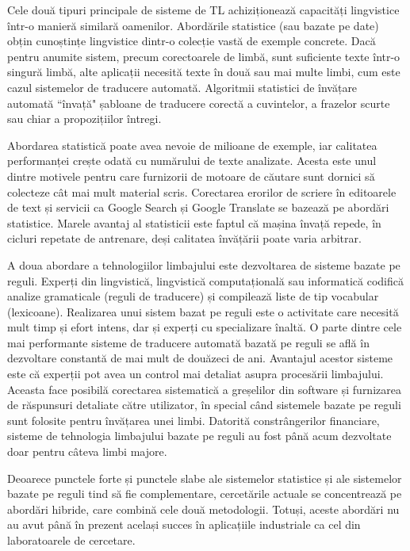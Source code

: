 \begin{multicols}{2}
Cele două tipuri principale de sisteme de TL achiziționează capacități lingvistice într-o manieră similară oamenilor. Abordările statistice (sau bazate pe date) obțin cunoștințe lingvistice dintr-o colecție vastă de exemple concrete. Dacă pentru anumite sistem, precum corectoarele de limbă, sunt suficiente texte într-o singură limbă, alte aplicații necesită texte în două sau mai multe limbi, cum este cazul sistemelor de traducere automată. Algoritmii statistici de învățare automată ``învață" șabloane de traducere corectă a cuvintelor, a frazelor scurte sau chiar a propozițiilor întregi.

Abordarea statistică poate avea nevoie de milioane de exemple, iar calitatea performanței crește odată cu numărului de texte analizate. Acesta este unul dintre motivele pentru care furnizorii de motoare de căutare sunt dornici să colecteze cât mai mult material scris. Corectarea erorilor de scriere în editoarele de text și servicii ca Google Search și Google Translate se bazează pe abordări statistice. Marele avantaj al statisticii este faptul că mașina învață repede, în cicluri repetate de antrenare, deși calitatea învățării poate varia arbitrar.

A doua abordare a tehnologiilor limbajului este dezvoltarea de sisteme bazate pe reguli. Experți din lingvistică, lingvistică computațională sau informatică codifică analize gramaticale (reguli de traducere) și compilează liste de tip vocabular (lexicoane). Realizarea unui sistem bazat pe reguli este o activitate care necesită mult timp și efort intens, dar și experți cu specializare înaltă. O parte dintre cele mai performante sisteme de traducere automată bazată pe reguli se află în dezvoltare constantă de mai mult de douăzeci de ani. Avantajul acestor sisteme este că experții pot avea un control mai detaliat asupra procesării limbajului. Aceasta face posibilă corectarea sistematică a greșelilor din software și furnizarea de răspunsuri detaliate către utilizator, în special când sistemele bazate pe reguli sunt folosite pentru învățarea unei limbi. Datorită constrângerilor financiare, sisteme de tehnologia limbajului bazate pe reguli au fost până acum dezvoltate doar pentru câteva limbi majore.

Deoarece punctele forte și punctele slabe ale sistemelor statistice și ale sistemelor bazate pe reguli tind să fie complementare, cercetările actuale se concentrează pe abordări hibride, care combină cele două metodologii. Totuși, aceste abordări nu au avut până în prezent același succes în aplicațiile industriale ca cel din laboratoarele de cercetare.


\end{multicols}
